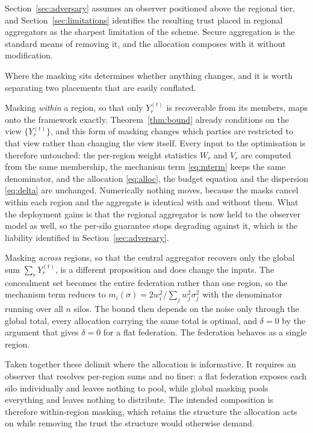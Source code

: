 \documentclass[acmsmall,screen,review,anonymous]{acmart}
\theoremstyle{acmdefinition}%
\begin{document}
Section~\ref{sec:adversary} assumes an observer positioned above the regional tier, and
Section~\ref{sec:limitations} identifies the resulting trust placed in regional
aggregators as the sharpest limitation of the scheme. Secure aggregation
\cite{bonawitz2017secagg} is the standard means of removing it, and the allocation
composes with it without modification.

Where the masking sits determines whether anything changes, and it is worth
separating two placements that are easily conflated.

Masking \emph{within} a region, so that only $Y_r^{(t)}$ is recoverable from its
members, maps onto the framework exactly. Theorem~\ref{thm:bound} already
conditions on the view $\{Y_r^{(t)}\}$, and this form of masking changes which
parties are restricted to that view rather than changing the view itself. Every
input to the optimisation is therefore untouched: the per-region weight statistics
$W_r$ and $V_r$ are computed from the same membership, the mechanism term
\eqref{eq:mterm} keeps the same denominator, and the allocation \eqref{eq:alloc},
the budget equation and the dispersion \eqref{eq:delta} are unchanged. Numerically
nothing moves, because the masks cancel within each region and the aggregate is
identical with and without them. What the deployment gains is that the regional
aggregator is now held to the observer model as well, so the per-silo guarantee
stops degrading against it, which is the liability identified in
Section~\ref{sec:adversary}.

Masking \emph{across} regions, so that the central aggregator recovers only the
global sum $\sum_r Y_r^{(t)}$, is a different proposition and does change the
inputs. The concealment set becomes the entire federation rather than one region,
so the mechanism term reduces to $m_i(\sigma) = 2w_i^2 / \sum_{j} w_j^2 \sigma_j^2$
with the denominator running over all $n$ silos. The bound then depends on the
noise only through the global total, every allocation carrying the same total is
optimal, and $\delta = 0$ by the argument that gives $\delta = 0$ for a flat
federation. The federation behaves as a single region.

Taken together these delimit where the allocation is informative. It requires an
observer that resolves per-region sums and no finer: a flat federation exposes each
silo individually and leaves nothing to pool, while global masking pools everything
and leaves nothing to distribute. The intended composition is therefore
within-region masking, which retains the structure the allocation acts on while
removing the trust the structure would otherwise demand.
\end{document}
